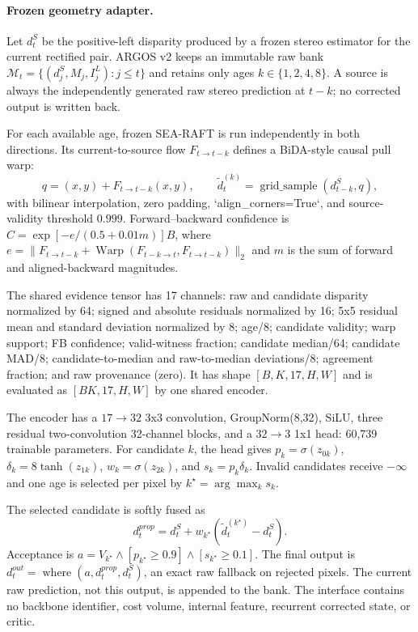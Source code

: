 \paragraph{Frozen geometry adapter.}
Let $d_t^S$ be the positive-left disparity produced by a frozen stereo estimator for the current rectified pair. ARGOS v2 keeps an immutable raw bank
\(\mathcal M_t=\{(d_j^S,M_j,I_j^L):j\le t\}\) and retains only ages $k\in\{1,2,4,8\}$. A source is always the independently generated raw stereo prediction at $t-k$; no corrected output is written back.

For each available age, frozen SEA-RAFT is run independently in both directions. Its current-to-source flow $F_{t\to t-k}$ defines a BiDA-style causal pull warp:
\[
q=(x,y)+F_{t\to t-k}(x,y),\qquad \widetilde d_t^{(k)}=\operatorname{grid\_sample}(d_{t-k}^S,q),
\]
with bilinear interpolation, zero padding, `align\_corners=True`, and source-validity threshold $0.999$. Forward--backward confidence is
\(C=\exp[-e/(0.5+0.01m)]B\), where $e=\|F_{t\to t-k}+\operatorname{Warp}(F_{t-k\to t},F_{t\to t-k})\|_2$ and $m$ is the sum of forward and aligned-backward magnitudes.

The shared evidence tensor has 17 channels: raw and candidate disparity normalized by 64; signed and absolute residuals normalized by 16; 5x5 residual mean and standard deviation normalized by 8; age/8; candidate validity; warp support; FB confidence; valid-witness fraction; candidate median/64; candidate MAD/8; candidate-to-median and raw-to-median deviations/8; agreement fraction; and raw provenance (zero). It has shape $[B,K,17,H,W]$ and is evaluated as $[BK,17,H,W]$ by one shared encoder.

The encoder has a $17\to32$ 3x3 convolution, GroupNorm(8,32), SiLU, three residual two-convolution 32-channel blocks, and a $32\to3$ 1x1 head: 60,739 trainable parameters. For candidate $k$, the head gives $p_k=\sigma(z_{0k})$, $\delta_k=8\tanh(z_{1k})$, $w_k=\sigma(z_{2k})$, and $s_k=p_k\delta_k$. Invalid candidates receive $-\infty$ and one age is selected per pixel by $k^\star=\arg\max_k s_k$.

The selected candidate is softly fused as
\[
d_t^{prop}=d_t^S+w_{k^\star}(\widetilde d_t^{(k^\star)}-d_t^S).
\]
Acceptance is $a=V_{k^\star}\land[p_{k^\star}\ge0.9]\land[s_{k^\star}\ge0.1]$. The final output is $d_t^{out}=\operatorname{where}(a,d_t^{prop},d_t^S)$, an exact raw fallback on rejected pixels. The current raw prediction, not this output, is appended to the bank. The interface contains no backbone identifier, cost volume, internal feature, recurrent corrected state, or critic.
